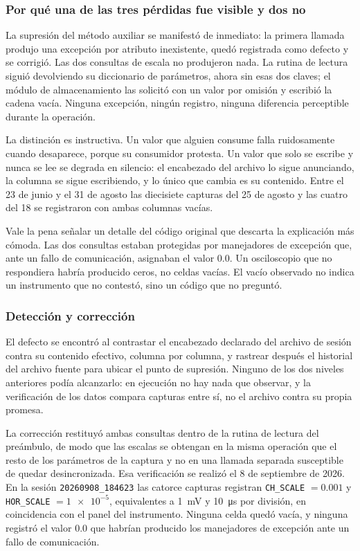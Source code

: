 \subsubsection*{Por qué una de las tres pérdidas fue visible y dos no}

La supresión del método auxiliar se manifestó de inmediato: la primera
llamada produjo una excepción por atributo inexistente, quedó registrada
como defecto y se corrigió. Las dos consultas de escala no produjeron
nada. La rutina de lectura siguió devolviendo su diccionario de
parámetros, ahora sin esas dos claves; el módulo de almacenamiento las
solicitó con un valor por omisión y escribió la cadena vacía. Ninguna
excepción, ningún registro, ninguna diferencia perceptible durante la
operación.

La distinción es instructiva. Un valor que alguien consume falla
ruidosamente cuando desaparece, porque su consumidor protesta. Un valor
que solo se escribe y nunca se lee se degrada en silencio: el encabezado
del archivo lo sigue anunciando, la columna se sigue escribiendo, y lo
único que cambia es su contenido. Entre el 23 de junio y el 31 de agosto
las diecisiete capturas del 25 de agosto y las cuatro del 18 se
registraron con ambas columnas vacías.

Vale la pena señalar un detalle del código original que descarta la
explicación más cómoda. Las dos consultas estaban protegidas por
manejadores de excepción que, ante un fallo de comunicación, asignaban
el valor \num{0.0}. Un osciloscopio que no respondiera habría producido
ceros, no celdas vacías. El vacío observado no indica un instrumento que
no contestó, sino un código que no preguntó.

\subsubsection*{Detección y corrección}

El defecto se encontró al contrastar el encabezado declarado del archivo
de sesión contra su contenido efectivo, columna por columna, y rastrear
después el historial del archivo fuente para ubicar el punto de
supresión. Ninguno de los dos niveles anteriores podía alcanzarlo: en
ejecución no hay nada que observar, y la verificación de los datos
compara capturas entre sí, no el archivo contra su propia promesa.

La corrección restituyó ambas consultas dentro de la rutina de lectura
del preámbulo, de modo que las escalas se obtengan en la misma operación
que el resto de los parámetros de la captura y no en una llamada
separada susceptible de quedar desincronizada.
Esa verificación se realizó el 8 de septiembre de 2026. En la sesión
\texttt{20260908\_184623} las catorce capturas registran
\texttt{CH\_SCALE} $=\num{0.001}$ y \texttt{HOR\_SCALE} $=\num{1e-5}$,
equivalentes a \SI{1}{\milli\volt} y \SI{10}{\micro\second} por
división, en coincidencia con el panel del instrumento. Ninguna celda
quedó vacía, y ninguna registró el valor \num{0.0} que habrían
producido los manejadores de excepción ante un fallo de comunicación.

